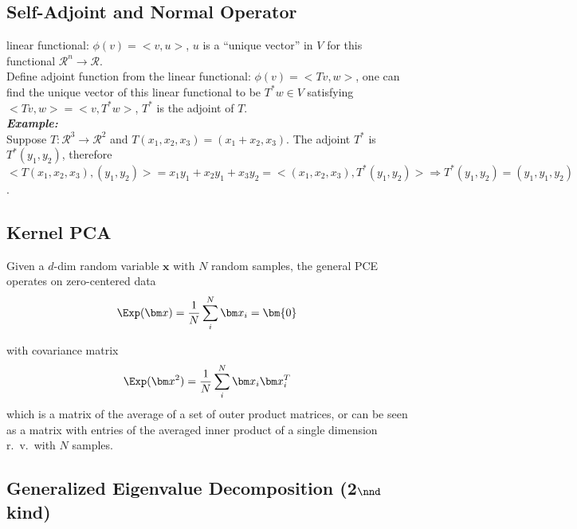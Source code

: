 \subsection{Self-Adjoint and Normal Operator} 
    linear functional: $\phi(v)= <v,u>$, $u$ is a ``unique vector'' in $V$ for this
    functional $\mathcal{R}^{n} \rightarrow \mathcal{R}$. \\
    Define adjoint function from the linear functional: $\phi(v)= < Tv, w>$, one
    can find the unique vector of this linear functional to be $T^*w \in V$
    satisfying $< Tv, w> = <v, T^*w>$, $T^*$ is the adjoint of $T$. \\ 
            
    {\emph{\bf Example:} \\ Suppose $T:\mathcal{R}^3 \rightarrow \mathcal{R}^2$ and
    $T(x_1,x_2,x_3)= (x_1+x_2,x_3)$.  The adjoint $T^*$ is $T^*(y_1,y_2)$,
    therefore $< T(x_1,x_2,x_3),(y_1,y_2)> = x_1y_1+x_2y_1+x_3y_2 =
    <(x_1,x_2,x_3),T^*(y_1,y_2)> \Rightarrow T^*(y_1,y_2)=(y_1,y_1,y_2)$. \\ }

\subsection{Kernel PCA} 
    Given a $d$-dim random variable $\bm x$ with $N$ random samples, the general
    PCE operates on zero-centered data 
    \begin{equation} 
        \Exp (\bm x)= \frac{1}{N} \sum\limits_i^N \bm x_i = \bm{0}   
    \end{equation}

    with covariance matrix \begin{equation} \Exp (\bm x^2)= \frac{1}{N}
    \sum\limits_i^N \bm x_i \bm x_i^T \end{equation} which is a matrix of the
    average of a set of outer product matrices, or can be seen as a matrix with
    entries of the averaged inner product of a single dimension r.\ v.\ with $N$
    samples.



\subsection{Generalized Eigenvalue Decomposition (2$\nnd$ kind)} 
